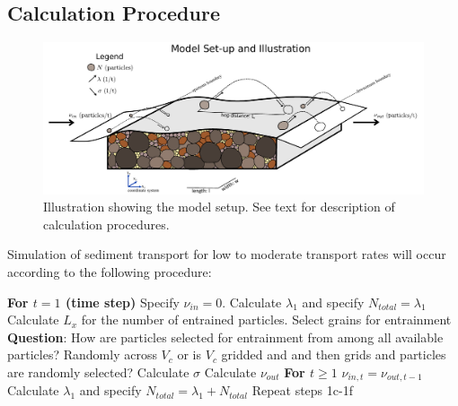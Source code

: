 \documentclass[12pt]{article}
\begin{document}
\subsection{Calculation Procedure}
\begin{figure}[!ht]
	\centering
		\includegraphics[width=1.1\textwidth]{Figures/Model_Setup.pdf}
		\caption{Illustration showing the model setup. See text for description of calculation procedures.}
	\label{Fig:Setup}
\end{figure}
Simulation of sediment transport for low to moderate transport rates will occur according to the following procedure:
\begin{outline}[enumerate]
\1 \textbf{For $t=1$ (time step)}
	\2 Specify $\nu_{in}=0$.
	\2 Calculate $\lambda_1$ and specify $N_{total}=\lambda_1$
	\2 Calculate $L_x$ for the number of entrained particles.
	\2 Select grains for entrainment
	\3 \textbf{Question}: How are particles selected for entrainment from among all available particles? Randomly across $V_c$ or is $V_c$ gridded and and then grids and particles are randomly selected?
	\2 Calculate $\sigma$
	\2 Calculate $\nu_{out}$
%
\1 \textbf{For $t\geq 1$}
	\2 $\nu_{in,t}=\nu_{out,t-1}$
	\2 Calculate $\lambda_1$ and specify $N_{total}=\lambda_1+N_{total}$
	\2 Repeat steps 1c-1f
\end{outline}
\end{document}
